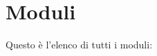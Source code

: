 \section{Moduli}
Questo è l'elenco di tutti i moduli\+:\begin{DoxyCompactList}
\item {}
\item {}
\item {}
\end{DoxyCompactList}
